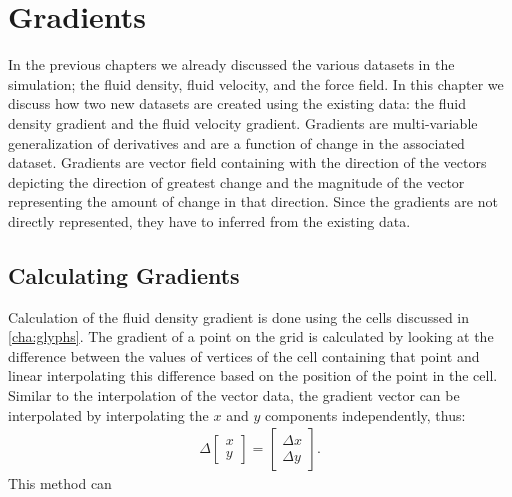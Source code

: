 \chapter{Gradients} %
\label{cha:gradients}
In the previous chapters we already discussed the various datasets in the simulation; the fluid density, fluid velocity, and the force field. In this chapter we discuss how two new datasets are created using the existing data: the fluid density gradient and the fluid velocity gradient. Gradients are multi-variable generalization of derivatives and are a function of change in the associated dataset. Gradients are vector field containing with the direction of the vectors depicting the direction of greatest change and the magnitude of the vector representing the amount of change in that direction. Since the gradients are not directly represented, they have to inferred from the existing data.
\section{Calculating Gradients} %
\label{sec:calculating_gradients}
Calculation of the fluid density gradient is done using the cells discussed in \cref{cha:glyphs}. The gradient of a point on the grid is calculated by looking at the difference between the values of vertices of the cell containing that point and linear interpolating this difference based on the position of the point in the cell. Similar to the interpolation of the vector data, the gradient vector can be interpolated by interpolating the $x$ and $y$ components independently, thus: 
\begin{align*}
\Delta \begin{bmatrix}x\\y \end{bmatrix} = \begin{bmatrix}\Delta x\\\Delta y \end{bmatrix} .
\end{align*}
This method can 


